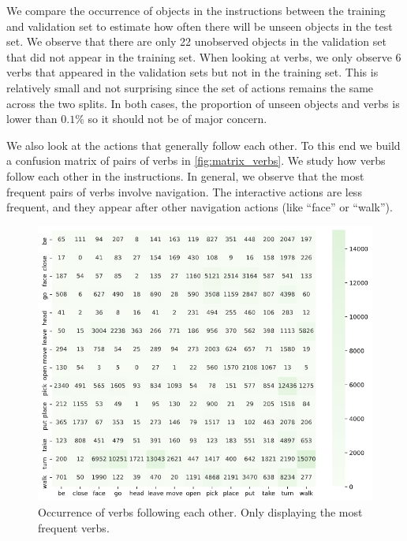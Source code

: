 \documentclass[11pt,a4paper]{article}
\begin{document}
We compare the occurrence of objects in the instructions between the training and validation set to estimate how often there will be unseen objects in the test set. We observe that there are only 22 unobserved objects in the validation set that did not appear in the training set.  When looking at verbs, we only observe 6 verbs that appeared in the validation sets but not in the training set. This is relatively small and not surprising since the set of actions remains the same across the two splits. In both cases, the proportion of unseen objects and verbs is lower than $0.1\%$ so it should not be of major concern.


We also look at the actions that generally follow each other. To this end we build a confusion matrix of pairs of verbs in \autoref{fig:matrix_verbs}. We study how verbs follow each other in the instructions. In general, we observe that the most frequent pairs of verbs involve navigation. The interactive actions are less frequent, and they appear after other navigation actions (like ``face'' or ``walk''). 

\begin{figure}
    \centering
    \includegraphics[width=\linewidth]{Reports/1-Task-Definition-and-Data/matrix_verbs.png}
    \caption{Occurrence of verbs following each other. Only displaying the most frequent verbs.}
    \label{fig:matrix_verbs}
\end{figure}
\end{document}
